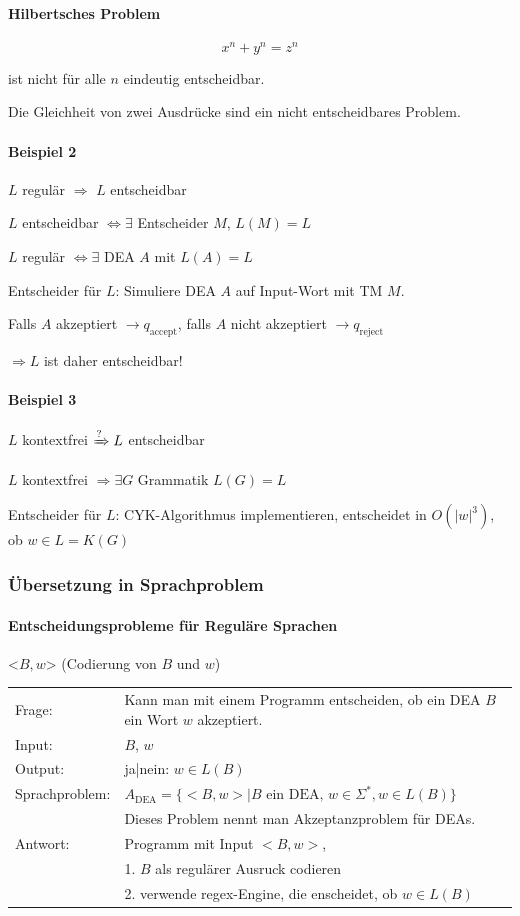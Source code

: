 	
\paragraph{Hilbertsches Problem}
\[
	x^n + y^n = z^n
\]

ist nicht für alle $n$ eindeutig entscheidbar.

Die Gleichheit von zwei Ausdrücke sind ein nicht entscheidbares Problem.

 \paragraph{Beispiel 2}
 
 $L$ regulär $\Rightarrow$ $L$ entscheidbar
 
 $L$ entscheidbar $\Leftrightarrow \exists$ Entscheider $M$, $L(M) = L$
 
 $L$ regulär $\Leftrightarrow \exists$ DEA $A$ mit $L(A) = L$
 
 Entscheider für $L$: Simuliere DEA $A$ auf Input-Wort mit TM $M$.
 
 Falls $A$ akzeptiert $\rightarrow q_\text{accept}$, falls $A$ nicht akzeptiert $\rightarrow q_\text{reject}$
 
 $\Rightarrow L$ ist daher entscheidbar!
 
 \paragraph{Beispiel 3}
 
 $L$ kontextfrei $\xRightarrow ? L$ entscheidbar
 
 $L$ kontextfrei $\Rightarrow \exists G$ Grammatik $L(G)=L$
 
 Entscheider für $L$: CYK-Algorithmus implementieren, entscheidet in $O(|w|^3)$, ob $w \in L = K(G)$
 
\subsubsection{Übersetzung in Sprachproblem}
 \paragraph{Entscheidungsprobleme für Reguläre Sprachen}
 
 <$B,w$> (Codierung von $B$ und $w$)
 
 \begin{tabular}{l l}
 Frage: &Kann man mit einem Programm entscheiden, ob ein DEA $B$ ein Wort $w$ akzeptiert. \\
 Input: &$B$, $w$ \\ 
 Output: &ja|nein: $w \in L(B)$ \\
Sprachproblem: & $ A_\text{DEA} = \{ <B,w> | B \text{ ein DEA, } w \in \Sigma^\ast, w \in L(B) \} $ \\
& Dieses Problem nennt man Akzeptanzproblem für DEAs. \\
Antwort: &Programm mit Input $<B,w>$, \\
&1. $B$ als regulärer Ausruck codieren \\
&2. verwende regex-Engine, die enscheidet, ob $w \in L(B)$
\end{tabular}

